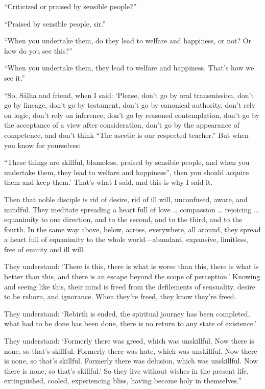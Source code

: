 \documentclass[12pt,openany]{book}%
\begin{document}
“Criticized or praised by sensible people?” 

“Praised by sensible people, sir.” 

“When you undertake them, do they lead to welfare and happiness, or not? Or how do you see this?” 

“When you undertake them, they lead to welfare and happiness. That’s how we see it.” 

“So, \textsanskrit{Sāḷha} and friend, when I said: ‘Please, don’t go by oral transmission, don’t go by lineage, don’t go by testament, don’t go by canonical authority, don’t rely on logic, don’t rely on inference, don’t go by reasoned contemplation, don’t go by the acceptance of a view after consideration, don’t go by the appearance of competence, and don’t think “The ascetic is our respected teacher.” But when you know for yourselves: 

“These things are skillful, blameless, praised by sensible people, and when you undertake them, they lead to welfare and happiness”, then you should acquire them and keep them.’ That’s what I said, and this is why I said it. 

Then that noble disciple is rid of desire, rid of ill will, unconfused, aware, and mindful. They meditate spreading a heart full of love … compassion … rejoicing … equanimity to one direction, and to the second, and to the third, and to the fourth. In the same way above, below, across, everywhere, all around, they spread a heart full of equanimity to the whole world—abundant, expansive, limitless, free of enmity and ill will. 

They understand: ‘There is this, there is what is worse than this, there is what is better than this, and there is an escape beyond the scope of perception.’ Knowing and seeing like this, their mind is freed from the defilements of sensuality, desire to be reborn, and ignorance. When they’re freed, they know they’re freed. 

They understand: ‘Rebirth is ended, the spiritual journey has been completed, what had to be done has been done, there is no return to any state of existence.’ 

They understand: ‘Formerly there was greed, which was unskillful. Now there is none, so that’s skillful. Formerly there was hate, which was unskillful. Now there is none, so that’s skillful. Formerly there was delusion, which was unskillful. Now there is none, so that’s skillful.’ So they live without wishes in the present life, extinguished, cooled, experiencing bliss, having become holy in themselves.” 
\end{document}
